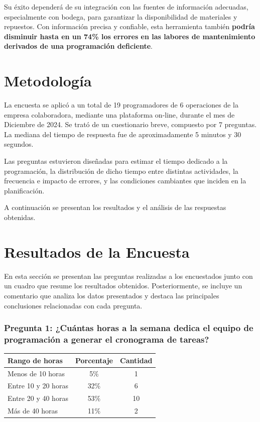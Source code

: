 \documentclass{article}
\begin{document}
\begin{appendix}
    Su éxito dependerá de su integración con las fuentes de información adecuadas, especialmente con bodega, para garantizar la disponibilidad de materiales y repuestos. Con información precisa y confiable, esta herramienta también \textbf{podría disminuir hasta en un 74\% los errores en las labores de mantenimiento derivados de una programación deficiente}.
    
    \section*{Metodología}
    
    La encuesta se aplicó a un total de 19 programadores de 6 operaciones de la empresa colaboradora, mediante una plataforma on-line, durante el mes de Diciembre de 2024. Se trató de un cuestionario breve, compuesto por 7 preguntas. La mediana del tiempo de respuesta fue de aproximadamente 5 minutos y 30 segundos. 
    
    Las preguntas estuvieron diseñadas para estimar el tiempo dedicado a la programación, la distribución de dicho tiempo entre distintas actividades, la frecuencia e impacto de errores, y las condiciones cambiantes que inciden en la planificación.
    
    A continuación se presentan los resultados y el análisis de las respuestas obtenidas.
    
    \section*{Resultados de la Encuesta}
    
    En esta sección se presentan las preguntas realizadas a los encuestados junto con un cuadro que resume los resultados obtenidos. Posteriormente, se incluye un comentario que analiza los datos presentados y destaca las principales conclusiones relacionadas con cada pregunta.
    
    \vspace{.5em}
    \subsubsection*{Pregunta 1: ¿Cuántas horas a la semana dedica el equipo de programación a generar el cronograma de tareas?}
    
    
    
    \begin{table}[htbp]
        \centering
        \begin{tabular}{lcc}
            \toprule
            \textbf{Rango de horas} & \textbf{Porcentaje} & \textbf{Cantidad} \\
            \midrule
            Menos de 10 horas & 5\% & 1 \\
            Entre 10 y 20 horas & 32\% & 6 \\
            Entre 20 y 40 horas & 53\% & 10 \\
            Más de 40 horas & 11\% & 2 \\
            \bottomrule
        \end{tabular}
        \label{tab:horas_semanales}
    \end{table}
    

\end{appendix}
\end{document}
